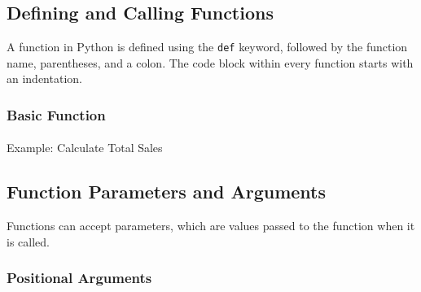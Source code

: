 \documentclass[
  letterpaper,
  DIV=11,
  numbers=noendperiod]{scrreprt}
\makeatletter
\let\oldparagraph\paragraph
\renewcommand{\paragraph}{
    \@ifstar
      \xxxParagraphStar
      \xxxParagraphNoStar
  }
\newcommand{\xxxParagraphStar}[1]{\oldparagraph*{#1}\mbox{}}
\newcommand{\xxxParagraphNoStar}[1]{\oldparagraph{#1}\mbox{}}
\newenvironment{Shaded}{\begin{snugshade}}{\end{snugshade}}
\newcommand{\BuiltInTok}[1]{\textcolor[rgb]{0.00,0.23,0.31}{#1}}
\newcommand{\CommentTok}[1]{\textcolor[rgb]{0.37,0.37,0.37}{#1}}
\newcommand{\ControlFlowTok}[1]{\textcolor[rgb]{0.00,0.23,0.31}{\textbf{#1}}}
\newcommand{\DecValTok}[1]{\textcolor[rgb]{0.68,0.00,0.00}{#1}}
\newcommand{\KeywordTok}[1]{\textcolor[rgb]{0.00,0.23,0.31}{\textbf{#1}}}
\newcommand{\NormalTok}[1]{\textcolor[rgb]{0.00,0.23,0.31}{#1}}
\newcommand{\OperatorTok}[1]{\textcolor[rgb]{0.37,0.37,0.37}{#1}}
\newcommand{\SpecialCharTok}[1]{\textcolor[rgb]{0.37,0.37,0.37}{#1}}
\newcommand{\SpecialStringTok}[1]{\textcolor[rgb]{0.13,0.47,0.30}{#1}}
\makeatother
\begin{document}
\subsection{Defining and Calling
Functions}\label{defining-and-calling-functions-1}

A function in Python is defined using the \texttt{def} keyword, followed
by the function name, parentheses, and a colon. The code block within
every function starts with an indentation.

\subsubsection{Basic Function}\label{basic-function}

\paragraph{Example: Calculate Total
Sales}\label{example-calculate-total-sales}

\begin{Shaded}
\end{Shaded}

\subsection{Function Parameters and
Arguments}\label{function-parameters-and-arguments}

Functions can accept parameters, which are values passed to the function
when it is called.

\subsubsection{Positional Arguments}\label{positional-arguments}
\end{document}
